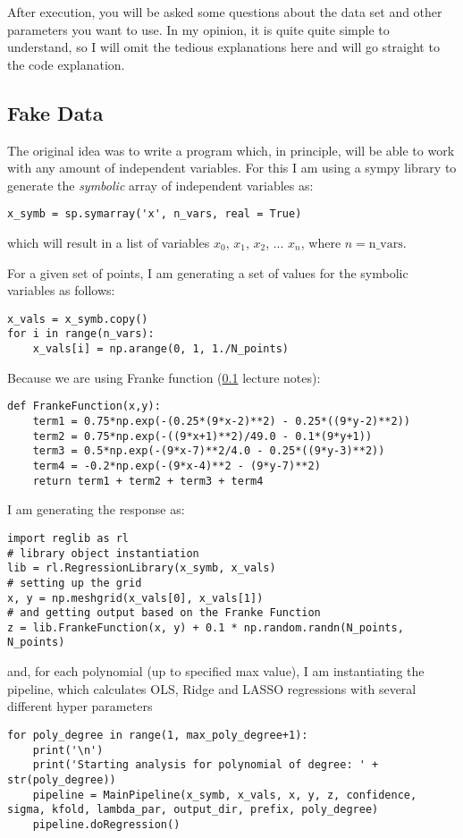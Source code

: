 After execution, you will be asked some questions about the data set and other parameters you want to use. In my opinion, it is quite quite simple to understand, so I will omit the tedious explanations here and will go straight to the code explanation.

\subsection{Fake Data}

The original idea was to write a program which, in principle, will be able to work with any amount of independent variables. For this I am using a sympy library to generate the \textit{symbolic} array of independent variables as:
\begin{lstlisting}
x_symb = sp.symarray('x', n_vars, real = True)
\end{lstlisting}
which will result in a list of variables $x_0$, $x_1$, $x_2$, ... $x_n$, where $n=\mathrm{n\_vars}$.

For a given set of points, I am generating a set of values for the symbolic variables as follows:
\begin{lstlisting}
x_vals = x_symb.copy()
for i in range(n_vars):
    x_vals[i] = np.arange(0, 1, 1./N_points)
\end{lstlisting}
Because we are using Franke function (\ref{} lecture notes):
\begin{lstlisting}
def FrankeFunction(x,y):
    term1 = 0.75*np.exp(-(0.25*(9*x-2)**2) - 0.25*((9*y-2)**2))
    term2 = 0.75*np.exp(-((9*x+1)**2)/49.0 - 0.1*(9*y+1))
    term3 = 0.5*np.exp(-(9*x-7)**2/4.0 - 0.25*((9*y-3)**2))
    term4 = -0.2*np.exp(-(9*x-4)**2 - (9*y-7)**2)
    return term1 + term2 + term3 + term4
\end{lstlisting}
I am generating the response as:
\begin{lstlisting}
import reglib as rl
# library object instantiation
lib = rl.RegressionLibrary(x_symb, x_vals)
# setting up the grid
x, y = np.meshgrid(x_vals[0], x_vals[1])
# and getting output based on the Franke Function
z = lib.FrankeFunction(x, y) + 0.1 * np.random.randn(N_points, N_points)
\end{lstlisting}
and, for each polynomial (up to specified max value), I am instantiating the pipeline, which calculates OLS, Ridge and LASSO regressions with several different hyper parameters
\begin{lstlisting}
for poly_degree in range(1, max_poly_degree+1):
    print('\n')
    print('Starting analysis for polynomial of degree: ' + str(poly_degree))
    pipeline = MainPipeline(x_symb, x_vals, x, y, z, confidence, sigma, kfold, lambda_par, output_dir, prefix, poly_degree)
    pipeline.doRegression()
\end{lstlisting}

